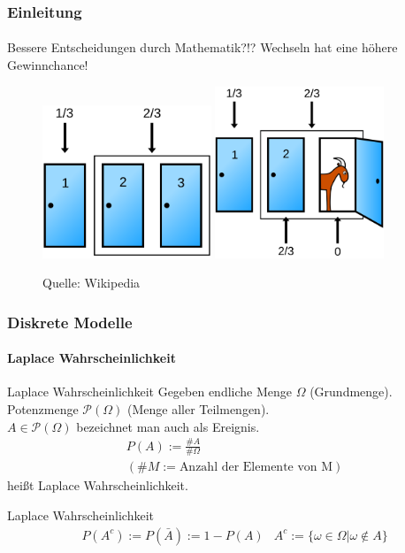 \documentclass{beamer}
\begin{document}
\begin{frame}
    \frametitle{Einleitung}
\framesubtitle{}

\begin{block}{Bessere Entscheidungen durch Mathematik?!?}
Wechseln hat eine höhere Gewinnchance!
\end{block}

\begin{figure}[htp]
      \centering
    \includegraphics[width=0.45\textwidth]{img/Monty_closed_1}
    \includegraphics[width=0.45\textwidth]{img/Monty_open_1}
      \caption{Quelle: Wikipedia}
\end{figure}

 \end{frame}


\begin{frame}
    \frametitle{Diskrete Modelle}
\framesubtitle{ Laplace Wahrscheinlichkeit}

\begin{block}{Laplace Wahrscheinlichkeit}
Gegeben endliche Menge $\Omega$ (Grundmenge). \\
Potenzmenge  $\mathcal{P}(\Omega)$   (Menge aller Teilmengen).  \\
$A \in \mathcal{P}(\Omega)$ bezeichnet man auch als Ereignis. 
\begin{align*}
& P(A) := \frac{ \#A}{ \# \Omega} \\
 & (\#M := \text{Anzahl der Elemente von M})
\end{align*}
heißt Laplace Wahrscheinlichkeit.
\end{block}

\begin{block}{Laplace Wahrscheinlichkeit}
\begin{align*}
& P(A^c) := P(\bar{A}) := 1 - P(A)
 & A^c := \{ \omega \in \Omega | \omega \notin A \}
\end{align*}
\end{block}


 \end{frame}
 
\end{document}
